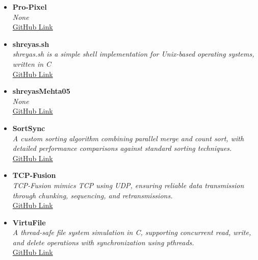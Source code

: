 \begin{itemize}[leftmargin=5mm, label={\small\textbullet}]
    \item \textbf{Pro-Pixel} \\ 
    \textit{None} \\ 
    \href{https://github.com/shreyasMehta05/Pro-Pixel}{GitHub Link} \
    
    \item \textbf{shreyas.sh} \\ 
    \textit{shreyas.sh is a simple shell implementation for Unix-based operating systems, written in C} \\ 
    \href{https://github.com/shreyasMehta05/shreyas.sh}{GitHub Link} \
    
    \item \textbf{shreyasMehta05} \\ 
    \textit{None} \\ 
    \href{https://github.com/shreyasMehta05/shreyasMehta05}{GitHub Link} \
    
    \item \textbf{SortSync} \\ 
    \textit{A custom sorting algorithm combining parallel merge and count sort, with detailed performance comparisons against standard sorting techniques.} \\ 
    \href{https://github.com/shreyasMehta05/SortSync}{GitHub Link} \
    
    \item \textbf{TCP-Fusion} \\ 
    \textit{TCP-Fusion mimics TCP using UDP, ensuring reliable data transmission through chunking, sequencing, and retransmissions.} \\ 
    \href{https://github.com/shreyasMehta05/TCP-Fusion}{GitHub Link} \
    
    \item \textbf{VirtuFile} \\ 
    \textit{A thread-safe file system simulation in C, supporting concurrent read, write, and delete operations with synchronization using pthreads.} \\ 
    \href{https://github.com/shreyasMehta05/VirtuFile}{GitHub Link} \
    
\end{itemize}
